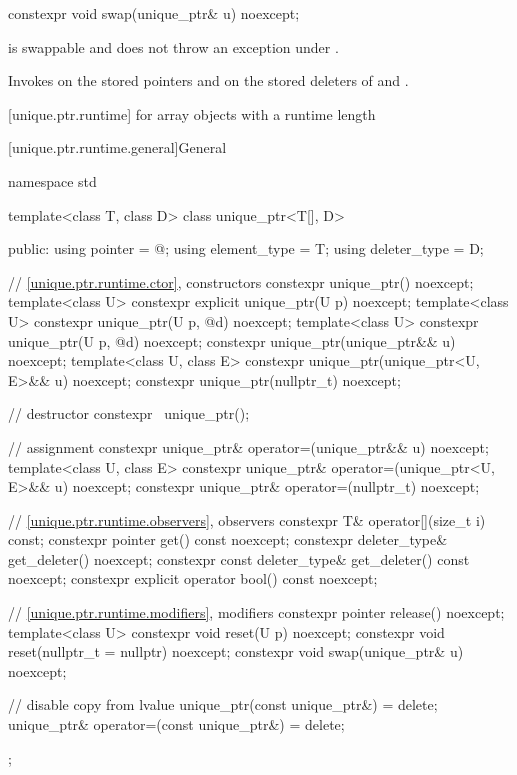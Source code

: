 %
\begin{itemdecl}
constexpr void swap(unique_ptr& u) noexcept;
\end{itemdecl}

\begin{itemdescr}
\pnum
\expects
{} is swappable and
does not throw an exception under .

\pnum
\effects
Invokes  on the stored pointers and on the stored
deleters of  and .
\end{itemdescr}

[unique.ptr.runtime]{ for array objects with a runtime length}

[unique.ptr.runtime.general]{General}

%
\begin{codeblock}
namespace std {
  template<class T, class D> class unique_ptr<T[], D> {
  public:
    using pointer      = @\seebelow@;
    using element_type = T;
    using deleter_type = D;

    // \ref{unique.ptr.runtime.ctor}, constructors
    constexpr unique_ptr() noexcept;
    template<class U> constexpr explicit unique_ptr(U p) noexcept;
    template<class U> constexpr unique_ptr(U p, @\seebelow@ d) noexcept;
    template<class U> constexpr unique_ptr(U p, @\seebelow@ d) noexcept;
    constexpr unique_ptr(unique_ptr&& u) noexcept;
    template<class U, class E>
      constexpr unique_ptr(unique_ptr<U, E>&& u) noexcept;
    constexpr unique_ptr(nullptr_t) noexcept;

    // destructor
    constexpr ~unique_ptr();

    // assignment
    constexpr unique_ptr& operator=(unique_ptr&& u) noexcept;
    template<class U, class E>
      constexpr unique_ptr& operator=(unique_ptr<U, E>&& u) noexcept;
    constexpr unique_ptr& operator=(nullptr_t) noexcept;

    // \ref{unique.ptr.runtime.observers}, observers
    constexpr T& operator[](size_t i) const;
    constexpr pointer get() const noexcept;
    constexpr deleter_type& get_deleter() noexcept;
    constexpr const deleter_type& get_deleter() const noexcept;
    constexpr explicit operator bool() const noexcept;

    // \ref{unique.ptr.runtime.modifiers}, modifiers
    constexpr pointer release() noexcept;
    template<class U> constexpr void reset(U p) noexcept;
    constexpr void reset(nullptr_t = nullptr) noexcept;
    constexpr void swap(unique_ptr& u) noexcept;

    // disable copy from lvalue
    unique_ptr(const unique_ptr&) = delete;
    unique_ptr& operator=(const unique_ptr&) = delete;
  };
}
\end{codeblock}

